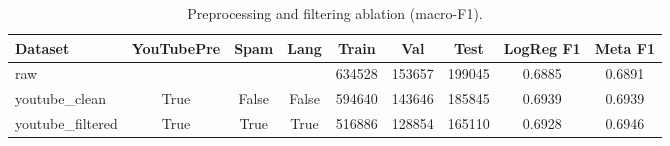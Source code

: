 \begin{table}[htbp]
\centering
\caption{Preprocessing and filtering ablation (macro-F1).}
\label{tab:preprocess_ablation}
\begin{tabular}{lcccccccc}
\toprule
\textbf{Dataset} & \textbf{YouTubePre} & \textbf{Spam} & \textbf{Lang} & \textbf{Train} & \textbf{Val} & \textbf{Test} & \textbf{LogReg F1} & \textbf{Meta F1} \\
\midrule
raw &  &  &  & 634528 & 153657 & 199045 & 0.6885 & 0.6891 \\
youtube_clean & True & False & False & 594640 & 143646 & 185845 & 0.6939 & 0.6939 \\
youtube_filtered & True & True & True & 516886 & 128854 & 165110 & 0.6928 & 0.6946 \\
\bottomrule
\end{tabular}
\end{table}
